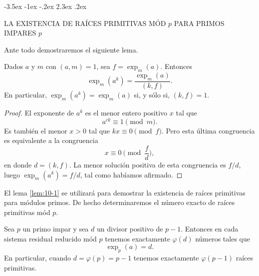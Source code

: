 \documentclass[12pt,a4paper]{book}
\makeatletter
\renewcommand\section{\@startsection{section}{1}{\z@}%
  {-3.5ex \@plus -1ex \@minus -.2ex}%
  {2.3ex \@plus .2ex}%
  {\normalfont\Large\bfseries\raggedright}}
\makeatother
\begin{document}
    \section{LA EXISTENCIA DE RAÍCES PRIMITIVAS MÓD \texorpdfstring{$p$}{p} PARA PRIMOS IMPARES \texorpdfstring{$p$}{p}}

    Ante todo demostraremos el siguiente lema.

    \begin{lema}\label{lem:10-1}
        Dados $a$ y $m$ con $(a,m)=1$, sea $f=\exp_{m}(a)$. Entonces
        \begin{equation*}
            \exp_{m}(a^{k})=\frac{\exp_{m}(a)}{(k,f)}.
        \end{equation*}
        En particular, $\exp_{m}(a^{k})=\exp_{m}(a)$ si, y sólo si, $(k,f)=1$.
    \end{lema}

    \begin{proof}
        El exponente de $a^{k}$ es el menor entero positivo $x$ tal que
        \begin{equation*}
            a^{ck}\equiv1\pmod{m}.
        \end{equation*}
        Es también el menor $x>0$ tal que $kx\equiv0\pmod{f}$. Pero esta última congruencia
        es equivalente a la congruencia
        \begin{equation*}
            x\equiv0\pmod{\frac{f}{d}},
        \end{equation*}
        en donde $d=(k,f)$. La menor solución positiva de esta congruencia es $f/d$, luego
        $\exp_{m}(a^{k})=f/d$, tal como habíamos afirmado.
    \end{proof}

    El lema \ref{lem:10-1} se utilizará para demostrar la existencia de raíces primitivas
    para módulos primos. De hecho determinaremos el número exacto de raíces primitivas mód
    $p$.

    \begin{teorema}\label{teo:10-4}
        Sea $p$ un primo impar y sea $d$ un divisor positivo de $p-1$. Entonces en cada
        sistema residual reducido mód $p$ tenemos exactamente $\varphi(d)$ números tales que
        \begin{equation*}
            \exp_{p}(a)=d.
        \end{equation*}
        En particular, cuando $d=\varphi(p)=p-1$ tenemos exactamente $\varphi(p-1)$ raíces
        primitivas.
    \end{teorema}
\end{document}
